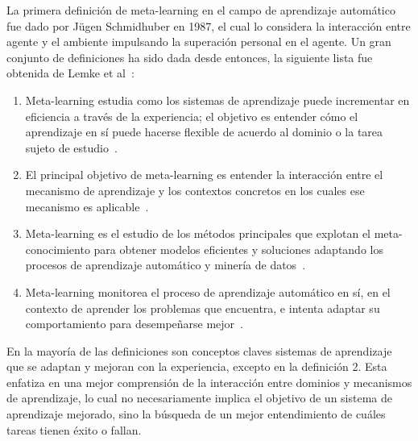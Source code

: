 
La primera definición de meta-learning en el campo de aprendizaje automático fue dado por J\"ugen Schmidhuber en 1987, el cual lo considera la interacción entre agente y el ambiente impulsando la superación personal en el agente. Un gran conjunto de definiciones ha sido dada desde entonces, la siguiente lista fue obtenida de Lemke et al~\cite{lemke2013metalearning}:

\begin{enumerate}
	\item Meta-learning estudia como los sistemas de aprendizaje puede incrementar en eficiencia a través de la experiencia; el objetivo es entender cómo el aprendizaje en sí puede hacerse flexible de acuerdo al dominio o la tarea sujeto de estudio~\cite{vilalta2001perspective}.
	\item El principal objetivo de meta-learning es entender la interacción entre el mecanismo de aprendizaje y los contextos concretos en los cuales ese mecanismo es aplicable~\cite{giraud2008metalearning}.
	\item Meta-learning es el estudio de los métodos principales que explotan el meta-conocimiento para obtener modelos eficientes y soluciones adaptando los procesos de aprendizaje automático y minería de datos~\cite{bradzil2009metalearning}.
	\item Meta-learning monitorea el proceso de aprendizaje automático en sí, en el contexto de aprender los problemas que encuentra, e intenta adaptar su comportamiento para desempeñarse mejor~\cite{vanschoren2010understanding}.
\end{enumerate}

En la mayoría de las definiciones son conceptos claves sistemas de aprendizaje que se adaptan y mejoran con la experiencia, excepto en la definición 2. Esta enfatiza en una mejor comprensión de la interacción entre dominios y mecanismos de aprendizaje, lo cual no necesariamente implica el objetivo de un sistema de aprendizaje mejorado, sino la búsqueda de un mejor entendimiento de cuáles tareas tienen éxito o fallan.

